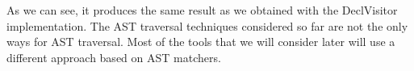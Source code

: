 As we can see, it produces the same result as we obtained with the DeclVisitor implementation. The AST traversal techniques considered so far are not the only ways for AST traversal. Most of the tools that we will consider later will use a different approach based on AST matchers.



































